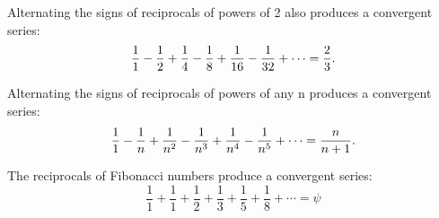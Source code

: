 \documentclass[UTF8, a4paper, 11pt, onecolumn]{article}
\begin{document}
Alternating the signs of reciprocals of powers of 2 also produces a convergent series:
\begin{equation*}
  {1 \over 1}-{1 \over 2}+{1 \over 4}-{1 \over 8}+{1 \over 16}-{1 \over 32}+\cdots ={2 \over 3}.
\end{equation*}

Alternating the signs of reciprocals of powers of any n produces a convergent series:
\begin{equation*}
  {\displaystyle {1 \over 1}-{1 \over n}+{1 \over n^{2}}-{1 \over n^{3}}+{1 \over n^{4}}-{1 \over n^{5}}+\cdots ={n \over n+1}.}
\end{equation*}

The reciprocals of Fibonacci numbers produce a convergent series:
\begin{equation*}
  {\frac {1}{1}}+{\frac {1}{1}}+{\frac {1}{2}}+{\frac {1}{3}}+{\frac {1}{5}}+{\frac {1}{8}}+\cdots =\psi
\end{equation*}
\end{document}
